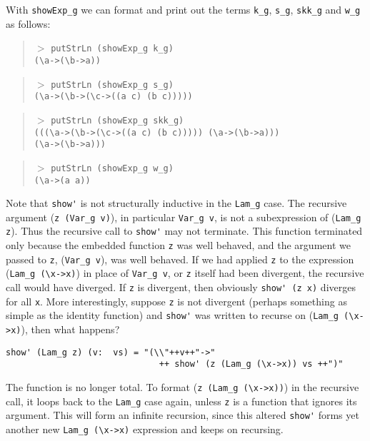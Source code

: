 \documentclass[letterpaper,12pt]{article}
\begin{document}
With \verb|showExp_g| we can format and print out the terms
\verb|k_g|, \verb|s_g|, \verb|skk_g| and \verb|w_g| as follows:
\begin{quote}\noindent
$>$ \verb|putStrLn (showExp_g k_g)|\\
\verb|(\a->(\b->a))|
\end{quote}\vspace*{-1em}
\begin{quote}\noindent
$>$ \verb|putStrLn (showExp_g s_g)|\\
\verb|(\a->(\b->(\c->((a c) (b c)))))|
\end{quote}\vspace*{-1em}
\begin{quote}\noindent
$>$ \verb|putStrLn (showExp_g skk_g)|\\
\verb|(((\a->(\b->(\c->((a c) (b c))))) (\a->(\b->a)))|\\
\verb|(\a->(\b->a)))|
\end{quote}\vspace*{-1em}
\begin{quote}\noindent
$>$ \verb|putStrLn (showExp_g w_g)|\\
\verb|(\a->(a a))|
\end{quote}\vspace*{-.5em}

Note that \verb|show'| is not structurally inductive in the \verb|Lam_g| case.
The recursive argument (\verb|z (Var_g v)|), in particular \verb|Var_g v|,
is not a subexpression of (\verb|Lam_g z|).  Thus the recursive call to
\verb|show'| may not terminate. This function terminated only because
the embedded function \verb|z| was well behaved, and the argument we passed
to \verb|z|, (\verb|Var_g v|), was well behaved. If we had applied \verb|z|
to the expression (\verb|Lam_g (\x->x)|) in place of \verb|Var_g v|,
or \verb|z| itself had been divergent, the recursive call would have diverged.
If \verb|z| is divergent, then obviously \verb|show' (z x)| diverges for
all \verb|x|. More interestingly, suppose \verb|z| is not divergent
(perhaps something as simple as the identity function) and \verb|show'|
was written to recurse on (\verb|Lam_g (\x->x)|), then what happens?
\begin{verbatim}
show' (Lam_g z) (v:  vs) = "(\\"++v++"->"
                              ++ show' (z (Lam_g (\x->x)) vs ++")"
\end{verbatim}
The function is no longer total.  To format (\verb|z (Lam_g (\x->x))|)
in the recursive call, it loops back to the \verb|Lam_g| case again,
unless \verb|z| is a function that ignores its argument.
This will form an infinite recursion, since this altered \verb|show'| forms
yet another new \verb|Lam_g (\x->x)| expression and keeps on recursing.
\end{document}
